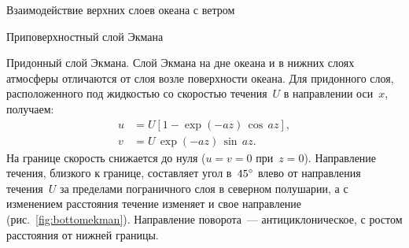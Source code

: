 \begin{chapter}{Взаимодействие верхних слоев океана с ветром}
\begin{section}{Приповерхностный слой Экмана}
\begin{paragraph}{Придонный слой Экмана.}
Слой Экмана на дне океана и в нижних слоях 
атмосферы отличаются от слоя возле поверхности океана. Для придонного слоя,
расположенного под жидкостью со скоростью течения~$U$ в направлении оси~$x$,
получаем:
\begin{subequations}
\begin{align}
 u&=U[1 - \exp(-az)\,\cos\,az],  \\
 v&=U\,\exp(-az)\,\sin\,az.
\end{align}
\end{subequations}
На границе скорость снижается до нуля ($u = v = 0$ при~$z = 0$). Направление
течения, близкого к границе, составляет угол в~${45}^\circ$ влево от 
направления течения~$U$ за пределами пограничного слоя в северном полушарии,
а с изменением расстояния течение изменяет и свое 
направление (рис.~\ref{fig:bottomekman}). Направление поворота~--- 
антициклоническое, с ростом расстояния от нижней границы.
%


\end{paragraph}
\end{section}
\end{chapter}
